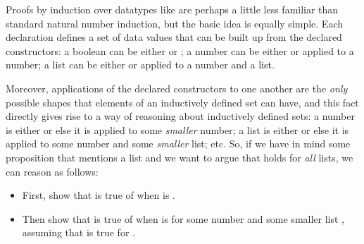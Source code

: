 \documentclass[12pt]{report}
\begin{document}
 Proofs by induction over datatypes like  are
    perhaps a little less familiar than standard natural number
    induction, but the basic idea is equally simple.  Each 
    declaration defines a set of data values that can be built up from
    the declared constructors: a boolean can be either  or
    ; a number can be either  or  applied to a number; a
    list can be either  or  applied to a number and a list.


    Moreover, applications of the declared constructors to one another
    are the \textit{only} possible shapes that elements of an inductively
    defined set can have, and this fact directly gives rise to a way
    of reasoning about inductively defined sets: a number is either
     or else it is  applied to some \textit{smaller} number; a list is
    either  or else it is  applied to some number and some
    \textit{smaller} list; etc. So, if we have in mind some proposition 
    that mentions a list  and we want to argue that  holds for
    \textit{all} lists, we can reason as follows:



\begin{itemize}
\item  First, show that  is true of  when  is .



\item  Then show that  is true of  when  is    for
        some number  and some smaller list , assuming that 
        is true for .

\end{itemize}
\end{document}
